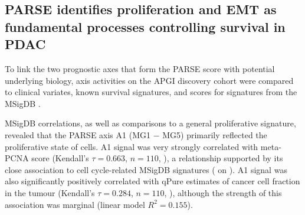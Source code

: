 \documentclass[dissertation.tex]{subfiles}
\begin{document}
\begin{figure}[!h]
\end{figure}


\subsection{\acrshort{PARSE} identifies proliferation and \acrshort{EMT} as fundamental processes controlling survival in \acrshort{PDAC}}
To link the two prognostic axes that form the \gls{PARSE} score with potential underlying biology, axis activities on the \gls{APGI} discovery cohort were compared to clinical variates, known survival signatures, and scores for signatures from the \gls{MSigDB} \cite{Subramanian2005}.

\gls{MSigDB} correlations, as well as comparisons to a general proliferative signature, revealed that the \gls{PARSE} axis A1 (MG1 $-$ MG5) primarily reflected the proliferative state of cells.  A1 signal was very strongly correlated with meta-PCNA \cite{Venet2011} score (Kendall's $\tau = 0.663$, $n = 110$, ), a relationship supported by its close association to cell cycle-related \gls{MSigDB} signatures ( on ).  A1 signal was also significantly positively correlated with qPure \cite{Song2012} estimates of cancer cell fraction in the tumour (Kendall's $\tau = 0.284$, $n = 110$, ), although the strength of this association was marginal (linear model $R^2 = 0.155$).
\end{document}
